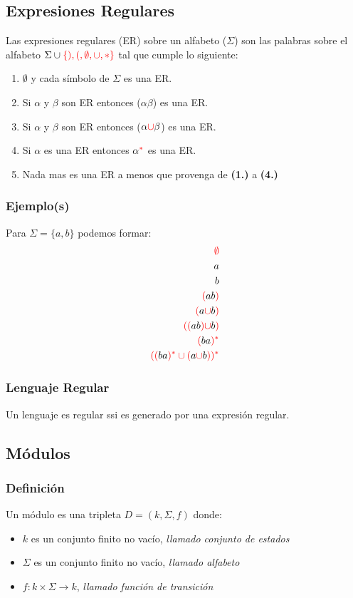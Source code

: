 \subsection{Expresiones Regulares}
Las expresiones regulares (ER) sobre un alfabeto ($\Sigma$) son las palabras sobre el alfabeto $\Sigma \cup {\color{red}\{ ), (, \emptyset, \cup,*\}}$ tal que cumple lo siguiente:
\renewcommand{\labelenumi}{\theenumi}
\renewcommand{\theenumi}{\textbf{\arabic {enumi}.)}}%
\begin{enumerate}
\item {\color{red}$\emptyset$} y cada símbolo de $\Sigma$ es una ER.
\item Si $\alpha$ y $\beta$ son ER entonces {\color{red}(}$\alpha\beta${\color{red})} es una ER.
\item Si $\alpha$ y $\beta$ son ER entonces {\color{red}(}$\alpha{\color{red}\cup}\beta${\color{red})} es una ER.
\item Si $\alpha$ es una ER entonces $\alpha^{{\color{red}*}}$ es una ER.
\item Nada mas es una ER a menos que provenga de \textbf{(1.)} a \textbf{(4.)}
\end{enumerate}
\subsubsection*{Ejemplo(s)}
Para $\Sigma = \{ a,b \}$ podemos formar:
\begin{align*}
{{\color{red}\emptyset}}\\
a\\
b\\
{{\color{red}(}}ab{{\color{red})}}\\
{{\color{red}(}}a{\color{red}\cup}b{{\color{red})}}\\
{{\color{red}(}}{\color{red}(}ab{\color{red})}{\color{red}\cup}b{{\color{red})}}\\
{{\color{red}(}}ba{{\color{red})^*}}\\
{\color{red}((}ba{\color{red})^*\cup(}a{\color{red}\cup}b{\color{red}))^*}
\end{align*}
\subsubsection*{Lenguaje Regular}
Un lenguaje es regular ssi es generado por una expresión regular.
\subsection{Módulos}
\subsubsection*{Definición}
Un módulo es una tripleta $D=(k,\Sigma,f)$ donde:
\begin{itemize}
\item $k$ es un conjunto finito no vacío, \textit{llamado conjunto de estados}
\item $\Sigma$ es un conjunto finito no vacío, \textit{llamado alfabeto}
\item $f:k\times\Sigma\rightarrow k$, \textit{llamado función de transición}
\end{itemize}
